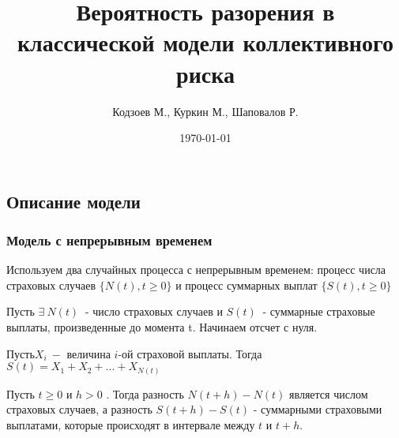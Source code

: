 \documentclass[12pt]{beamer}
\title[Модель коллективного риска]{Вероятность разорения в классической модели коллективного риска}
\author{Кодзоев М., Куркин М., Шаповалов Р.}
\institute[ВМК МГУ]
{
Московский Государственный Университет им. Ломоносова
}
\date{\today} %
\begin{document}
\begin{frame}
\titlepage
\end{frame}

\begin{frame}
\tableofcontents
\end{frame}

\begin{frame}
\section{Описание модели}
\frametitle{Модель с непрерывным временем} 
Используем два случайных процесса с непрерывным временем: процесс числа страховых случаев  $\big\{N(t), t\geq 0\big\}$  и процесс суммарных выплат $\big\{S(t), t\geq 0\big\}$ 

Пусть $\exists \: N(t)\: $ - число страховых случаев и $S(t)\:  $ - суммарные страховые выплаты, произведенные до момента t. Начинаем отсчет с нуля.

Пусть$ X_{i} \:-$ величина $i$-ой страховой выплаты. Тогда $S(t) = X_{1}+X_{2}+...+X_{N(t)}$

Пусть $t\geq 0$ и $h> 0$ . Тогда разность $N(t+h)-N(t)$ является числом страховых случаев, а разность $S(t+h) -S(t)$ - суммарными страховыми выплатами, которые происходят в интервале между $t$ и $t + h$.


\end{frame}
\end{document}
